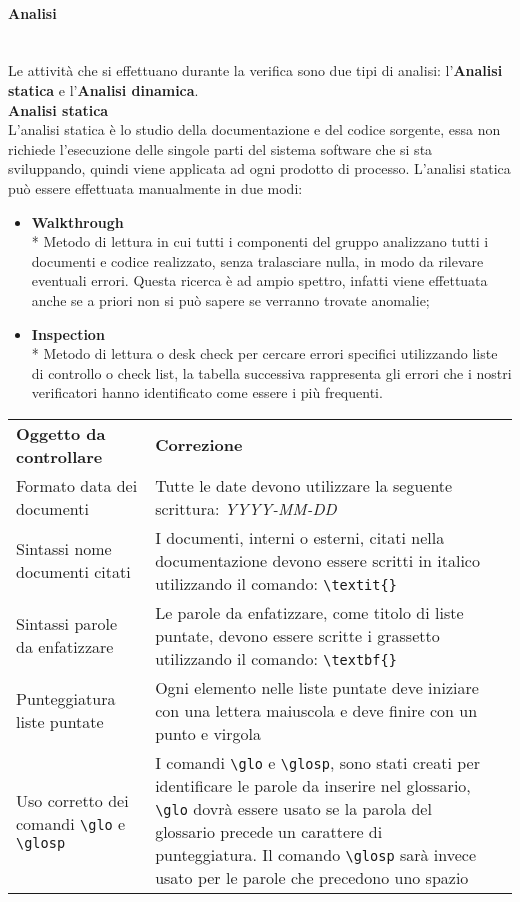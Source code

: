 \paragraph{Analisi}\mbox{}\\ [1mm]
Le attività che si effettuano durante la verifica sono due tipi di analisi: l'\textbf{Analisi statica} e l'\textbf{Analisi dinamica}. \\[2mm]
\textbf{Analisi statica}\mbox{}\\ [1mm]
L'analisi statica è lo studio della documentazione e del codice sorgente, essa non richiede l'esecuzione delle singole parti del sistema software che si sta sviluppando, quindi viene applicata ad ogni prodotto di processo. L'analisi statica può essere effettuata manualmente in due modi:
\begin{itemize}
	\item \textbf{Walkthrough} \\*
	Metodo di lettura in cui tutti i componenti del gruppo analizzano tutti i documenti e codice realizzato, senza tralasciare nulla, in modo da rilevare eventuali errori. Questa ricerca è ad ampio spettro, infatti viene effettuata anche se a priori non si può sapere se verranno trovate anomalie;
	\item \textbf{Inspection} \\*
	Metodo di lettura o desk check per cercare errori specifici utilizzando liste di controllo o check list, la tabella successiva rappresenta gli errori che i nostri verificatori hanno identificato come essere i più frequenti.
\end{itemize}
\begin{longtable} {
		>{\centering}p{55mm} 
		>{\centering}p{55mm}
		>{}p{0mm}}
	\rowcolor{gray!50}
	\textbf{Oggetto da controllare} & \textbf{Correzione} & \TBstrut \\[2mm]
	Formato data dei documenti & Tutte le date devono utilizzare la seguente scrittura: \textit{YYYY-MM-DD}  &  \TBstrut \\[2mm]
	Sintassi nome documenti citati & I documenti, interni o esterni, citati nella documentazione devono essere scritti in italico utilizzando il comando: \verb|\textit{}|  &  \TBstrut \\[2mm]
	Sintassi parole da enfatizzare & Le parole da enfatizzare, come titolo di liste puntate, devono essere scritte i grassetto utilizzando il comando: \verb|\textbf{}|  &  \TBstrut \\[2mm]
	Punteggiatura liste puntate & Ogni elemento nelle liste puntate deve iniziare con una lettera maiuscola e deve finire con un punto e virgola &  \TBstrut \\[2mm]
	Uso corretto dei comandi \verb|\glo| e \verb|\glosp| & I comandi \verb|\glo| e \verb|\glosp|, sono stati creati per identificare le parole da inserire nel glossario, \verb|\glo| dovrà essere usato se la parola del glossario precede un carattere di punteggiatura. Il comando \verb|\glosp| sarà invece usato per le parole che precedono uno spazio &  \TBstrut \\	[2mm]
\end{longtable}

